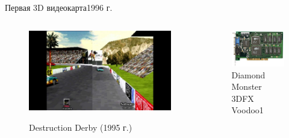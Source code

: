 \documentclass{beamer}
\begin{document}
\begin{frame}{Первая 3D видеокарта}{1996 г.}
	\begin{columns}
		\begin{column}{0.5\textwidth}
			
			\begin{figure}
				\href{https://www.youtube.com/watch?app=desktop&v=Zdf270cZD9g}{
				\includegraphics[width=\textwidth]{images/Destruction_Derby_1995.png}}
				\caption {Destruction Derby (1995 г.)}
			\end{figure}
		\end{column}
		\begin{column}{0.5\textwidth}
			\begin{figure} 
				\includegraphics[width=\textwidth]{images/Diamond_Monster_3D_3DFX_Voodoo1.png}
				\caption {Diamond Monster 3DFX Voodoo1}
			\end{figure}
		\end{column}
	\end{columns}
\end{frame}
\end{document}
